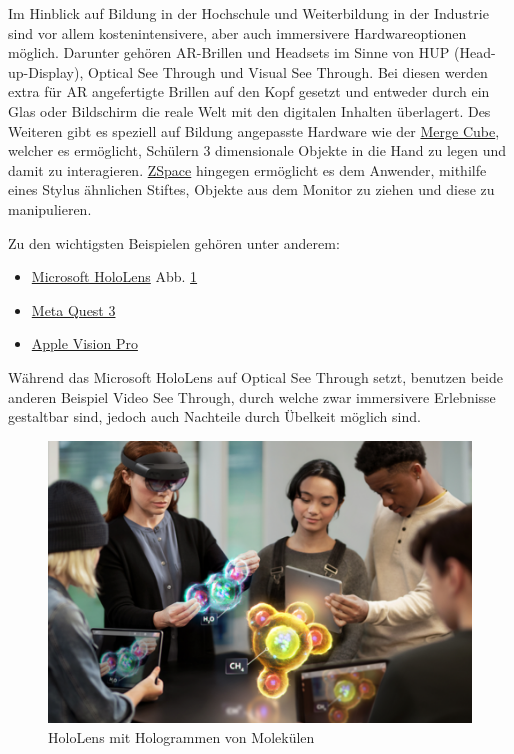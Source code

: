 \documentclass[conference]{IEEEtran}
\begin{document}
Im Hinblick auf Bildung in der Hochschule und Weiterbildung in der Industrie sind vor allem kostenintensivere,
aber auch immersivere Hardwareoptionen möglich. Darunter gehören AR-Brillen und Headsets im Sinne von HUP (Head-up-Display),
Optical See Through und Visual See Through. Bei diesen werden extra für AR angefertigte Brillen auf den Kopf gesetzt und entweder durch ein Glas oder Bildschirm die reale Welt mit den digitalen Inhalten überlagert.
Des Weiteren gibt es speziell auf Bildung angepasste Hardware wie der 
\href{https://mergeedu.com/cube?cr=4646}{Merge Cube}, welcher es ermöglicht, Schülern 3 dimensionale Objekte in die Hand zu
legen und damit zu interagieren. \href{https://zspace.com/}{ZSpace} hingegen ermöglicht es dem Anwender, mithilfe eines Stylus ähnlichen Stiftes, Objekte aus dem Monitor zu ziehen und diese zu manipulieren. \cite{b12}

Zu den wichtigsten Beispielen gehören unter anderem:
\begin{itemize}
    \item \href{https://www.microsoft.com/de-de/hololens}{Microsoft HoloLens} Abb. \ref{fig2}
    \item \href{https://www.meta.com/de/quest/quest-3/}{Meta Quest 3}
    \item \href{https://www.apple.com/de/apple-vision-pro/}{Apple Vision Pro}
\end{itemize}

Während das Microsoft HoloLens auf Optical See Through setzt, benutzen beide anderen Beispiel Video See Through, durch welche
zwar immersivere Erlebnisse gestaltbar sind, jedoch auch Nachteile durch Übelkeit möglich sind.

\begin{figure}[htbp]
    \centerline{\includegraphics[scale=0.2]{img/holo.png}}
    \caption{HoloLens mit Hologrammen von Molekülen \cite{w3}}
    \label{fig2}
\end{figure}
\end{document}
